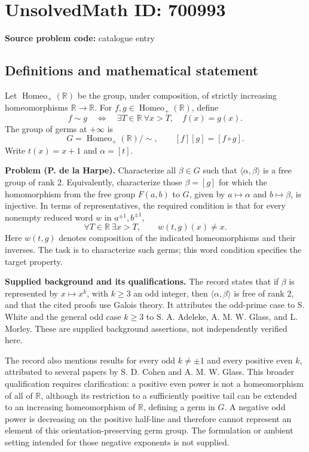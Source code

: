 \documentclass[11pt]{article}
\newcommand{\R}{\mathbb{R}}
\begin{document}
\section*{UnsolvedMath ID: 700993}
\textbf{Source problem code:} catalogue entry
\subsection{Definitions and mathematical statement}
Let \(\operatorname{Homeo}_{+}(\R)\) be the group, under composition, of strictly increasing homeomorphisms \(\R\to\R\). For \(f,g\in\operatorname{Homeo}_{+}(\R)\), define
\[
f\sim g\quad\Longleftrightarrow\quad \exists T\in\R\ \forall x>T,\quad f(x)=g(x).
\]
The group of germs at \(+\infty\) is
\[
G=\operatorname{Homeo}_{+}(\R)/{\sim},\qquad [f][g]=[f\circ g].
\]
Write \(t(x)=x+1\) and \(\alpha=[t]\).

\textbf{Problem (P. de la Harpe).} Characterize all \(\beta\in G\) such that \(\langle\alpha,\beta\rangle\) is a free group of rank \(2\). Equivalently, characterize those \(\beta=[g]\) for which the homomorphism from the free group \(F(a,b)\) to \(G\), given by \(a\mapsto\alpha\) and \(b\mapsto\beta\), is injective. In terms of representatives, the required condition is that for every nonempty reduced word \(w\) in \(a^{\pm1},b^{\pm1}\),
\[
\forall T\in\R\ \exists x>T,\qquad w(t,g)(x)\ne x.
\]
Here \(w(t,g)\) denotes composition of the indicated homeomorphisms and their inverses. The task is to characterize such germs; this word condition specifies the target property.

\textbf{Supplied background and its qualifications.} The record states that if \(\beta\) is represented by \(x\mapsto x^k\), with \(k\ge3\) an odd integer, then \(\langle\alpha,\beta\rangle\) is free of rank \(2\), and that the cited proofs use Galois theory. It attributes the odd-prime case to S. White and the general odd case \(k\ge3\) to S. A. Adeleke, A. M. W. Glass, and L. Morley. These are supplied background assertions, not independently verified here.

The record also mentions results for every odd \(k\ne\pm1\) and every positive even \(k\), attributed to several papers by S. D. Cohen and A. M. W. Glass. This broader qualification requires clarification: a positive even power is not a homeomorphism of all of \(\R\), although its restriction to a sufficiently positive tail can be extended to an increasing homeomorphism of \(\R\), defining a germ in \(G\). A negative odd power is decreasing on the positive half-line and therefore cannot represent an element of this orientation-preserving germ group. The formulation or ambient setting intended for those negative exponents is not supplied.
\end{document}
